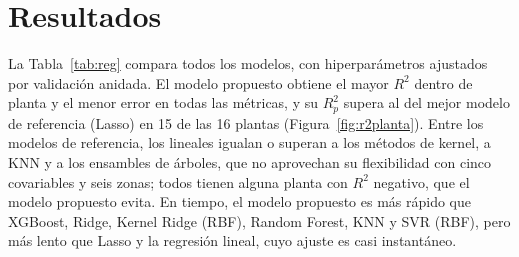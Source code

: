 \documentclass[pdflatex,sn-mathphys-num]{sn-jnl}
\begin{document}
\section{Resultados}\label{sec:resultados}

La Tabla~\ref{tab:reg} compara todos los modelos, con hiperparámetros ajustados por validación anidada. El modelo propuesto obtiene el mayor $R^2$ dentro de planta y el menor error en todas las métricas, y su $R^2_p$ supera al del mejor modelo de referencia (Lasso) en 15 de las 16 plantas (Figura~\ref{fig:r2planta}). Entre los modelos de referencia, los lineales igualan o superan a los métodos de kernel, a KNN y a los ensambles de árboles, que no aprovechan su flexibilidad con cinco covariables y seis zonas; todos tienen alguna planta con $R^2$ negativo, que el modelo propuesto evita. En tiempo, el modelo propuesto es más rápido que XGBoost, Ridge, Kernel Ridge (RBF), Random Forest, KNN y SVR (RBF), pero más lento que Lasso y la regresión lineal, cuyo ajuste es casi instantáneo.
\end{document}
